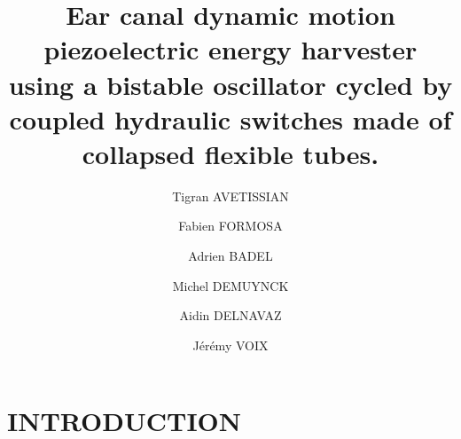 \documentclass[3p,twocolumn,preprint]{elsarticle}
\begin{document}
\tableofcontents

\begin{frontmatter}



\title{Ear canal dynamic motion piezoelectric energy harvester using a bistable oscillator cycled by coupled hydraulic switches made of collapsed flexible tubes.}



\address[symme]{Laboratoire SYMME - Université Savoie Mont Blanc, 7 Chemin de Bellevue, 74940, Annecy}
\address[critias]{Laboratoire Critias - École de Technologie Supérieure, 1100 Rue Notre-Dame Ouest, Montréal, QC, H3C 1K3}


\author[symme]{Tigran AVETISSIAN}
\author[symme]{Fabien FORMOSA}
\author[symme]{Adrien BADEL}

\author[critias]{Michel DEMUYNCK}
\author[critias]{Aidin DELNAVAZ}
\author[critias]{Jérémy VOIX}


\begin{abstract}
\end{abstract}

\begin{keyword}
\end{keyword}

\end{frontmatter}


\section{INTRODUCTION}
\label{INTRODUCTION} %
\end{document}
